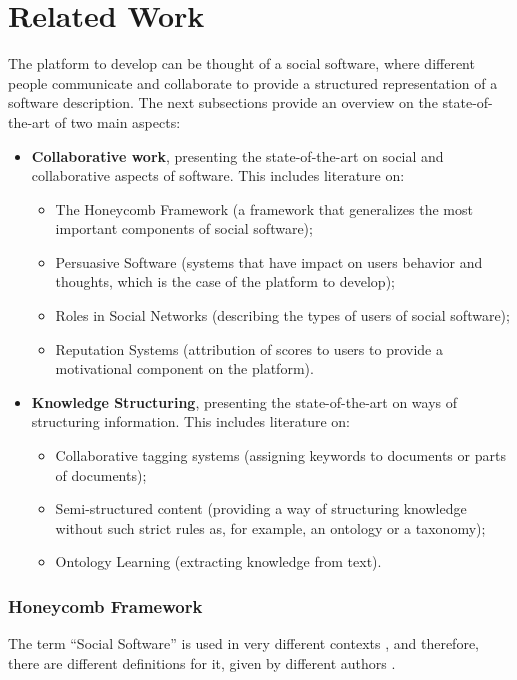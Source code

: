 
\chapter{Related Work}
\label{chapter:relatedwork}
\label{related}
The platform to develop can be thought of a social software, where different people communicate and collaborate to provide a structured representation of a software description.
The next subsections provide an overview on the state-of-the-art of two main aspects:
\begin{itemize}
\item \textbf{Collaborative work}, presenting the state-of-the-art on social and collaborative aspects of software. This includes literature on:
	\begin{itemize}
		\item The Honeycomb Framework (a framework that generalizes the most important components of social software);
		\item Persuasive Software (systems that have impact on users behavior and thoughts, which is the case of the platform to develop);
		\item Roles in Social Networks (describing the types of users of social software);
		\item Reputation Systems (attribution of scores to users to provide a motivational component on the platform).
	\end{itemize}
	
\item \textbf{Knowledge Structuring}, presenting the state-of-the-art on ways of structuring information. This includes literature on:
	\begin{itemize}
		\item Collaborative tagging systems (assigning keywords to documents or parts of documents);
		\item Semi-structured content (providing a way of structuring knowledge without such strict rules as, for example, an ontology or a taxonomy);
		\item Ontology Learning (extracting knowledge from text).
	\end{itemize} 
\end{itemize}


\subsection{Honeycomb Framework}
The term ``Social Software'' is used in very different contexts \cite{pereira2010social}, and therefore, there are different definitions for it, given by different authors \cite{shirky2005group,klamma2007social,kolko2007mobile,wiley2008tagging,chatti2007future}. 

